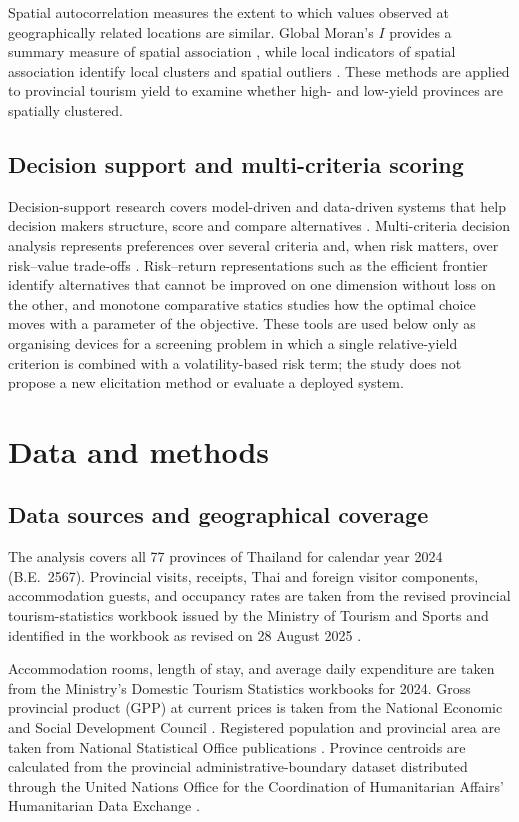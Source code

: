 \documentclass[11pt,a4paper]{article}
\theoremstyle{plain}\newtheorem{proposition}{Proposition}
\theoremstyle{definition}\newtheorem{definition}{Definition}
\begin{document}
Spatial autocorrelation measures the extent to which values observed at geographically related locations are similar. Global Moran's $I$ provides a summary measure of spatial association \citep{moran1950}, while local indicators of spatial association identify local clusters and spatial outliers \citep{anselin1995}. These methods are applied to provincial tourism yield to examine whether high- and low-yield provinces are spatially clustered.

\subsection{Decision support and multi-criteria scoring}
Decision-support research covers model-driven and data-driven systems that help decision makers structure, score and compare alternatives \citep{shim2002}. Multi-criteria decision analysis represents preferences over several criteria and, when risk matters, over risk--value trade-offs \citep{keeney1976,belton2002}. Risk--return representations such as the efficient frontier \citep{markowitz1952} identify alternatives that cannot be improved on one dimension without loss on the other, and monotone comparative statics \citep{milgrom1994} studies how the optimal choice moves with a parameter of the objective. These tools are used below only as organising devices for a screening problem in which a single relative-yield criterion is combined with a volatility-based risk term; the study does not propose a new elicitation method or evaluate a deployed system.

\section{Data and methods}
\subsection{Data sources and geographical coverage}
The analysis covers all 77 provinces of Thailand for calendar year 2024 (B.E.\ 2567). Provincial visits, receipts, Thai and foreign visitor components, accommodation guests, and occupancy rates are taken from the revised provincial tourism-statistics workbook issued by the Ministry of Tourism and Sports and identified in the workbook as revised on 28 August 2025 \citep{mots2025a}.

Accommodation rooms, length of stay, and average daily expenditure are taken from the Ministry's Domestic Tourism Statistics workbooks for 2024. Gross provincial product (GPP) at current prices is taken from the National Economic and Social Development Council \citep{nesdc2025}. Registered population and provincial area are taken from National Statistical Office publications \citep{nso2025,nso2026}. Province centroids are calculated from the provincial administrative-boundary dataset distributed through the United Nations Office for the Coordination of Humanitarian Affairs' Humanitarian Data Exchange \citep{ocha2019}.
\end{document}
